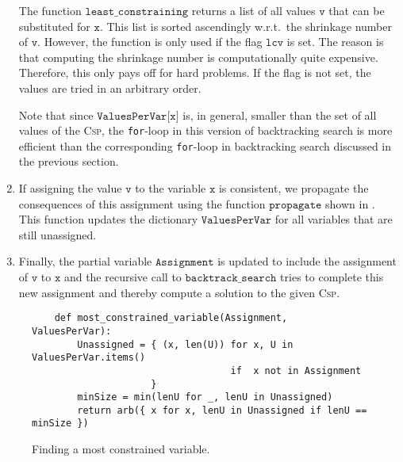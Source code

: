 \begin{enumerate}
      The function $\texttt{least\_constraining}$ returns a list of all values $\texttt{v}$
      that can be substituted for $\texttt{x}$.  This list is sorted ascendingly w.r.t.~the shrinkage number of
      $\texttt{v}$.  However, the function is only used if the flag $\texttt{lcv}$ is set.  The reason is that
      computing the shrinkage number is computationally quite expensive.  Therefore, this only pays off for hard
      problems.  If the flag is not set, the values are tried in an arbitrary order.

      Note that since
      $\texttt{ValuesPerVar[x]}$ is, in general, smaller than the set of all values of the \textsc{Csp},
      the \texttt{for}-loop in this version of backtracking search is more efficient than the corresponding
      \texttt{for}-loop in backtracking search discussed in the previous section. 
\item If assigning the value $\texttt{v}$ to the variable $\texttt{x}$ is consistent, we propagate the consequences
      of this assignment using the function $\texttt{propagate}$ shown in
      .
      This function updates the dictionary $\mathtt{ValuesPerVar}$ for all variables that are still unassigned.
\item Finally, the partial variable $\texttt{Assignment}$ is updated to include the assignment of 
      $\texttt{v}$ to $\texttt{x}$ and the recursive call to $\texttt{backtrack\_search}$ tries to complete this new
      assignment and thereby compute a solution to the given \textsc{Csp}. 
\end{enumerate}

\begin{figure}[!ht]
\centering
\begin{verbatim}
    def most_constrained_variable(Assignment, ValuesPerVar):
        Unassigned = { (x, len(U)) for x, U in ValuesPerVar.items()
                                   if  x not in Assignment
                     }
        minSize = min(lenU for _, lenU in Unassigned)
        return arb({ x for x, lenU in Unassigned if lenU == minSize })
\end{verbatim}
\vspace*{-0.3cm}
\caption{Finding a most constrained variable.}
\label{fig:Constraint-Propagation-Solver.ipynb:most_constrained_variable}
\end{figure}

